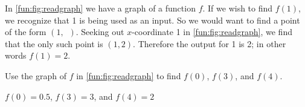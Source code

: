 	In \cref{fun:fig:readgraph} we have a graph of a function $f$. If we wish to find $f(1)$, we recognize that \num{1} is being used as an input. So we would want to find a point of the form $(1,\phantom{y})$. Seeking out $x$-coordinate \num{1} in \cref{fun:fig:readgraph}, we find that the only such point is $(1,2)$. Therefore the output for \num{1} is \num{2}; in other words $f(1)=2$.
	
	\begin{doyouunderstand}
		\begin{problem}
		Use the graph of $f$ in \cref{fun:fig:readgraph} to find $f(0)$, $f(3)$, and $f(4)$.
		\begin{shortsolution}
			$f(0)=0.5$, $f(3)=3$, and $f(4)=2$
		\end{shortsolution}
		\end{problem}
	\end{doyouunderstand}
	
